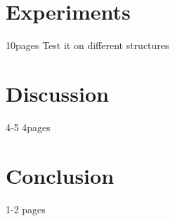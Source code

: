 \documentclass[doctype=mastersthesis,BCOR=15mm,biblatex]{ldvbook}%
\begin{document}
\chapter{Experiments}
10pages
Test it on different structures

\chapter{Discussion}
4-5 4pages

\chapter{Conclusion}
1-2 pages







\printbibliography{}
\end{document}
